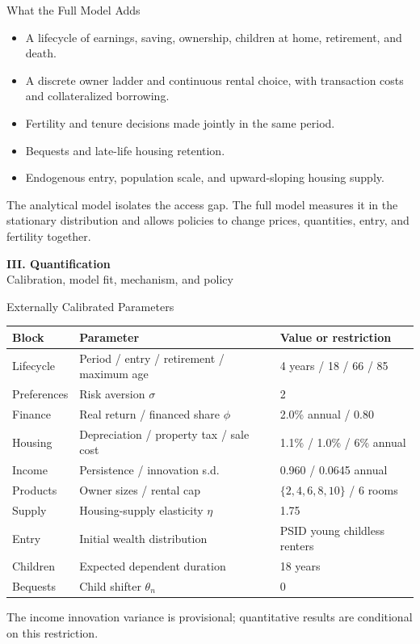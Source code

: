 \documentclass[aspectratio=169,11pt]{beamer}
\newcommand{\tightitems}{\setlength{\itemsep}{0.55em}}
\newcommand{\1}{\mathbf 1}
\begin{document}
\begin{frame}{What the Full Model Adds}
  \begin{itemize}\tightitems
    \item A lifecycle of earnings, saving, ownership, children at home, retirement, and death.
    \item A discrete owner ladder and continuous rental choice, with transaction costs and collateralized borrowing.
    \item Fertility and tenure decisions made jointly in the same period.
    \item Bequests and late-life housing retention.
    \item Endogenous entry, population scale, and upward-sloping housing supply.
  \end{itemize}

  \vfill
  The analytical model isolates the access gap. The full model measures it in the stationary distribution and allows policies to change prices, quantities, entry, and fertility together.
\end{frame}

\begin{frame}
  \centering
  {\Large\textbf{III. Quantification}}\\[0.8em]
  {\normalsize Calibration, model fit, mechanism, and policy}
\end{frame}

\begin{frame}{Externally Calibrated Parameters}
  \footnotesize
  \renewcommand{\arraystretch}{1.02}
  \centering
  \begin{tabular}{@{}lll@{}}
    \toprule
    Block & Parameter & Value or restriction \\
    \midrule
    Lifecycle & Period / entry / retirement / maximum age & 4 years / 18 / 66 / 85 \\
    Preferences & Risk aversion $\sigma$ & 2 \\
    Finance & Real return / financed share $\phi$ & 2.0\% annual / 0.80 \\
    Housing & Depreciation / property tax / sale cost & 1.1\% / 1.0\% / 6\% annual \\
    Income & Persistence / innovation s.d. & 0.960 / 0.0645 annual \\
    Products & Owner sizes / rental cap & $\{2,4,6,8,10\}$ / 6 rooms \\
    Supply & Housing-supply elasticity $\eta$ & 1.75 \\
    Entry & Initial wealth distribution & PSID young childless renters \\
    Children & Expected dependent duration & 18 years \\
    Bequests & Child shifter $\theta_n$ & 0 \\
    \bottomrule
  \end{tabular}

  \vfill
  The income innovation variance is provisional; quantitative results are conditional on this restriction.
\end{frame}
\end{document}
